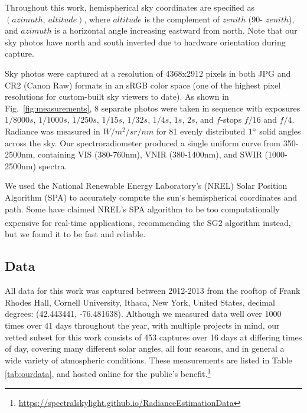 Throughout this work, hemispherical sky coordinates are specified as $(azimuth, ~altitude)$, where $altitude$ is the complement of $zenith$ (90\degree - $zenith$), and $azimuth$ is a horizontal angle increasing eastward from north. Note that our sky photos have north and south inverted due to hardware orientation during capture.

Sky photos were captured at a resolution of 4368x2912 pixels in both JPG and CR2 (Canon Raw) formats in an sRGB color space (one of the highest pixel resolutions for custom-built sky viewers to date). As shown in Fig.~\ref{fig:measurements}, 8 separate photos were taken in sequence with exposures $1/8000s$, $1/1000s$, $1/250s$, $1/15s$, $1/32s$, $1/4s$, $1s$, $2s$, and $f$-stops $f/16$ and $f/4$. Radiance was measured in $W/m^2/sr/nm$ for 81 evenly distributed $1\degree$ solid angles across the sky. Our spectroradiometer produced a single uniform curve from 350-2500nm, containing VIS (380-760nm), VNIR (380-1400nm), and SWIR (1000-2500nm) spectra.

We used the National Renewable Energy Laboratory's (NREL) Solar Position Algorithm (SPA)\cite{reda_spa} to accurately compute the sun's hemispherical coordinates and path. Some have claimed NREL's SPA algorithm to be too computationally expensive for real-time applications, recommending the SG2 algorithm instead,\textsuperscript{,} but we found it to be fast and reliable.

\subsection{Data}
\label{sec:data}

All data for this work was captured between 2012-2013 from the rooftop of Frank Rhodes Hall, Cornell University, Ithaca, New York, United States, decimal degrees: (42.443441, -76.481638). Although we measured data well over 1000 times over 41 days throughout the year, with multiple projects in mind, our vetted subset for this work consists of 453 captures over 16 days at differing times of day, covering many  different solar angles, all four seasons, and in general a wide variety of atmospheric conditions. These measurements are listed in Table \ref{tab:ourdata}, and hosted online for the public's benefit.\footnote{\url{https://spectralskylight.github.io/RadianceEstimationData}}

